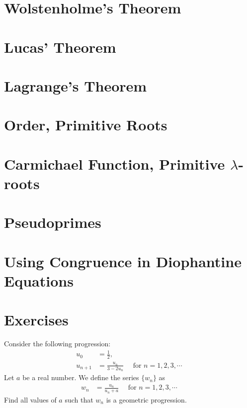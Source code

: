 \documentclass{subfile}
\begin{document}
	\section{Wolstenholme's Theorem}
		
	\section{Lucas' Theorem}
			
	\section{Lagrange's Theorem}
		
	\section{Order, Primitive Roots} \label{sec:order}
		
	\section{Carmichael Function, Primitive $\lambda$-roots}
		
	\section{Pseudoprimes} \label{sec:pseudoprimes}
		
	\section{Using Congruence in Diophantine Equations}
		

		\newpage	
		\section{Exercises}
	
	\begin{problem} %
		Consider the following progression:
		\begin{align*}
		u_0 &= \frac{1}{2},\\
		u_{n+1} &= \frac{u_n}{3-2u_n} \quad \text{ for } n=1,2,3,\cdots
		\end{align*}
		Let $a$ be a real number. We define the series $\{w_n\}$ as
		\begin{align*}
		w_n &= \frac{u_n}{u_n + a} \quad \text{ for } n=1,2,3,\cdots
		\end{align*}
		Find all values of $a$ such that $w_n$ is a geometric progression.
	\end{problem}		
	
\end{document}

